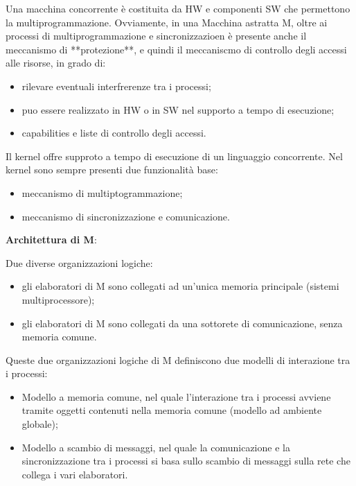 \documentclass{article}
\begin{document}
\vspace{3mm}
Una macchina concorrente è costituita da HW e componenti SW che permettono la multiprogrammazione. Ovviamente, in una Macchina astratta M, oltre
ai processi di multiprogrammazione e sincronizzazioen è presente anche il meccanismo di **protezione**, e quindi il meccaniscmo di controllo
degli accessi alle risorse, in grado di:
\begin{itemize}
    \item rilevare eventuali interfrerenze tra i processi;
    \item puo essere realizzato in HW o in SW nel supporto a tempo di esecuzione;
    \item capabilities e liste di controllo degli accessi.
\end{itemize}

\vspace{3mm}
Il kernel offre supproto a tempo di esecuzione di un linguaggio concorrente.
Nel kernel sono sempre presenti due funzionalità base:
\begin{itemize}
    \item meccanismo di multiptogrammazione;
    \item meccanismo di sincronizzazione e comunicazione.
\end{itemize}

\vspace{5mm}
\textbf{Architettura di M}:

Due diverse organizzazioni logiche:
\begin{itemize}
    \item gli elaboratori di M sono collegati ad un'unica memoria principale (sistemi multiprocessore);
    \item gli elaboratori di M sono collegati da una sottorete di comunicazione, senza memoria comune.
\end{itemize}

\vspace{3mm}
Queste due organizzazioni logiche di M definiscono due modelli di interazione tra i processi:
\begin{itemize}
    \item Modello a memoria comune, nel quale l'interazione tra i processi avviene tramite oggetti contenuti nella memoria comune (modello ad ambiente globale);
    \item Modello a scambio di messaggi, nel quale la comunicazione e la sincronizzazione tra i processi si basa sullo scambio di messaggi sulla rete che collega
    i vari elaboratori.
\end{itemize}
\end{document}
